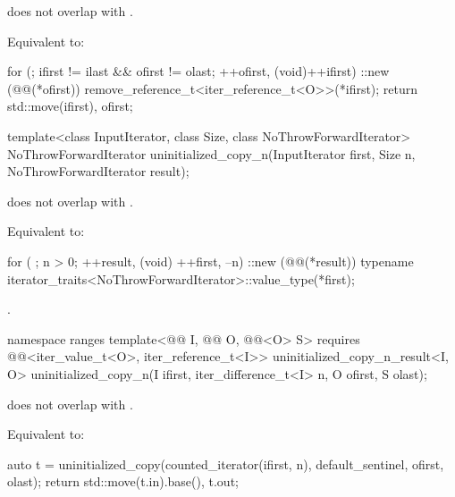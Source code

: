 \begin{itemdescr}
\pnum
\expects
{} does not overlap with .

\pnum
\effects
Equivalent to:
\begin{codeblock}
for (; ifirst != ilast && ofirst != olast; ++ofirst, (void)++ifirst)
  ::new (@@(*ofirst)) remove_reference_t<iter_reference_t<O>>(*ifirst);
return {std::move(ifirst), ofirst};
\end{codeblock}
\end{itemdescr}

%
\begin{itemdecl}
template<class InputIterator, class Size, class NoThrowForwardIterator>
  NoThrowForwardIterator uninitialized_copy_n(InputIterator first, Size n,
                                              NoThrowForwardIterator result);
\end{itemdecl}

\begin{itemdescr}
\pnum
\expects
{} does not overlap with .

\pnum
\effects
Equivalent to:
\begin{codeblock}
for ( ; n > 0; ++result, (void) ++first, --n)
  ::new (@@(*result))
    typename iterator_traits<NoThrowForwardIterator>::value_type(*first);
\end{codeblock}

\pnum
\returns
{}.
\end{itemdescr}

%
\begin{itemdecl}
namespace ranges {
  template<@@ I, @@ O, @@<O> S>
    requires @@<iter_value_t<O>, iter_reference_t<I>>
    uninitialized_copy_n_result<I, O>
      uninitialized_copy_n(I ifirst, iter_difference_t<I> n, O ofirst, S olast);
}
\end{itemdecl}

\begin{itemdescr}
\pnum
\expects
{} does not overlap with
.

\pnum
\effects
Equivalent to:
\begin{codeblock}
auto t = uninitialized_copy(counted_iterator(ifirst, n),
                            default_sentinel, ofirst, olast);
return {std::move(t.in).base(), t.out};
\end{codeblock}
\end{itemdescr}

